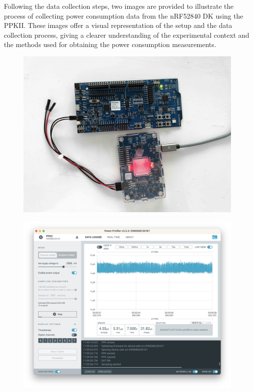 Following the data collection steps, two images are provided to illustrate the process of collecting power consumption data from the nRF52840 DK using the PPKII. These images offer a visual representation of the setup and the data collection process, giving a clearer understanding of the experimental context and the methods used for obtaining the power consumption measurements.

\begin{figure}[H]
    \centering
    \begin{minipage}[t]{0.45\textwidth}
        \centering
        \includegraphics[width=1\linewidth]{images/research_design/PPK2_Router.jpg}
        \label{fig:router_source_meter}
    \end{minipage}\hfill
    \begin{minipage}[t]{0.45\textwidth}
        \centering
        \includegraphics[width=1\linewidth]{images/research_design/PPK2_SDK.jpg}
        \label{fig:ppk2_source_meter}
    \end{minipage}
\end{figure}
